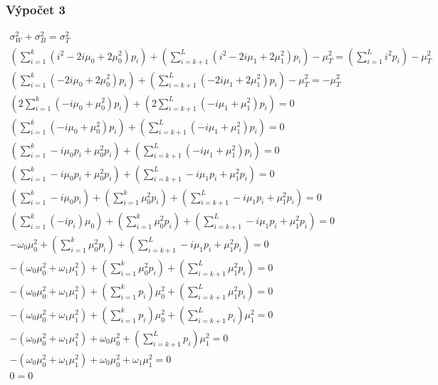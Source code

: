 \documentclass[12pt, a4paper]{report}
\begin{document}
\newpage
\subsubsection*{Výpočet 3}
\begin{eqnarray}
	\sigma_W^2 + \sigma_B^2 = \sigma_T^2\\
	\left( \sum_{i = 1}^k \left( i^2 - 2 i \mu_0 + 2 \mu_0^2 \right) p_i \right) + \left( \sum_{i = k + 1}^L \left( i^2 - 2 i \mu_1 + 2 \mu_1^2 \right) p_i \right) - \mu_T^2 = \left( \sum_{i = 1}^{L} i^2 p_i \right) - \mu_T^2\\
	\left( \sum_{i = 1}^k \left(- 2 i \mu_0 + 2 \mu_0^2 \right) p_i \right) + \left( \sum_{i = k + 1}^L \left(- 2 i \mu_1 + 2 \mu_1^2 \right) p_i \right) - \mu_T^2 = - \mu_T^2\\
	\left( 2 \sum_{i = 1}^k \left(-  i \mu_0 + \mu_0^2 \right) p_i \right) + \left( 2 \sum_{i = k + 1}^L \left(- i \mu_1 + \mu_1^2 \right) p_i \right) = 0\\
	\left( \sum_{i = 1}^k \left(- i \mu_0 + \mu_0^2 \right) p_i \right) + \left( \sum_{i = k + 1}^L \left(- i \mu_1 + \mu_1^2 \right) p_i \right) = 0\\
	\left( \sum_{i = 1}^k - i \mu_0 p_i + \mu_0^2 p_i \right) + \left( \sum_{i = k + 1}^L \left(- i \mu_1 + \mu_1^2 \right) p_i \right) = 0\\
	\left( \sum_{i = 1}^k - i \mu_0 p_i + \mu_0^2 p_i \right) + \left( \sum_{i = k + 1}^L - i \mu_1 p_i + \mu_1^2 p_i \right) = 0\\
	\left( \sum_{i = 1}^k - i \mu_0 p_i \right) + \left( \sum_{i = 1}^k \mu_0^2 p_i \right) + \left( \sum_{i = k + 1}^L - i \mu_1 p_i + \mu_1^2 p_i \right) = 0\\
	\left( \sum_{i = 1}^k \left( - i p_i \right) \mu_0 \right) + \left( \sum_{i = 1}^k \mu_0^2 p_i \right) + \left( \sum_{i = k + 1}^L - i \mu_1 p_i + \mu_1^2 p_i \right) = 0\\
	- \omega_0 \mu_0^2 + \left( \sum_{i = 1}^k \mu_0^2 p_i \right) + \left( \sum_{i = k + 1}^L - i \mu_1 p_i + \mu_1^2 p_i \right) = 0\\
	- \left( \omega_0  \mu_0^2 + \omega_1  \mu_1^2 \right) + \left( \sum_{i = 1}^k \mu_0^2 p_i \right) + \left( \sum_{i = k + 1}^L \mu_1^2 p_i \right) = 0\\
	- \left( \omega_0  \mu_0^2 + \omega_1  \mu_1^2 \right) + \left( \sum_{i = 1}^k p_i \right)\mu_0^2  + \left( \sum_{i = k + 1}^L \mu_1^2 p_i \right) = 0\\
	- \left( \omega_0  \mu_0^2 + \omega_1  \mu_1^2 \right) + \left( \sum_{i = 1}^k p_i \right) \mu_0^2 +  \left( \sum_{i = k + 1}^L p_i \right)\mu_1^2 = 0\\
	- \left( \omega_0  \mu_0^2 + \omega_1  \mu_1^2 \right) +  \omega_0 \mu_0^2+  \left( \sum_{i = k + 1}^L p_i \right)\mu_1^2 = 0\\
	- \left( \omega_0  \mu_0^2 + \omega_1  \mu_1^2 \right) + \omega_0  \mu_0^2 + \omega_1 \mu_1^2 = 0\\
	0 = 0
\end{eqnarray}
\end{document}

